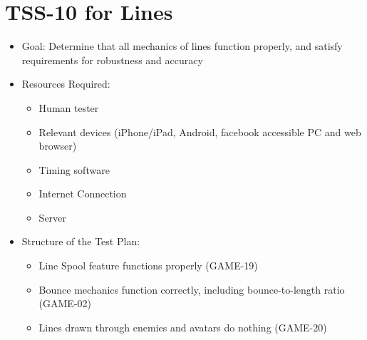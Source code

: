 \section{TSS-10 for Lines}
\begin{itemize}
\item Goal: Determine that all mechanics of lines function properly, and satisfy requirements for robustness and accuracy

\item Resources Required:
\begin{itemize}
\item Human tester
\item Relevant devices (iPhone/iPad, Android, facebook accessible PC and web browser)
\item Timing software
\item Internet Connection 
\item Server
\end{itemize}

\item Structure of the Test Plan: 
\begin{itemize}

\item Line Spool feature functions properly (GAME-19)
\item Bounce mechanics function correctly, including bounce-to-length ratio (GAME-02)
\item Lines drawn through enemies and avatars do nothing (GAME-20)

\end{itemize}
\end{itemize}

